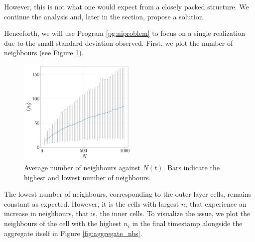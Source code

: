 However, this is not what one would expect from a closely packed structure. We continue the analysis and, later in the section, propose a solution.

Henceforth, we will use Program \ref{pg:niproblem} to focus on a single realization due to the small standard deviation observed. First, we plot the number of neighbours (see Figure \ref{fig:ncells_vs_ni}).

\begin{figure}[ht]
    \centering
    \includegraphics[width=0.5\textwidth]{figures/302/302-ncells-vs-ni_single.png}
    \caption{Average number of neighbours against $N(t)$. Bars indicate the highest and lowest number of neighbours.}
    \label{fig:ncells_vs_ni}
\end{figure}

The lowest number of neighbours, corresponding to the outer layer cells, remains constant as expected. However, it is the cells with largest $n_i$ that experience an increase in neighbours, that is, the inner cells. To visualize the issue, we plot the neighbours of the cell with the highest $n_i$ in the final timestamp alongside the aggregate itself in Figure \ref{fig:aggregate_nbs}.

